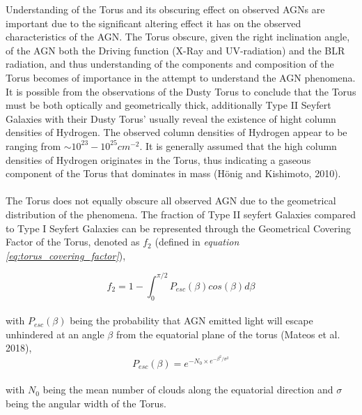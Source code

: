 \documentclass[a4paper, 12pt, twoside]{article}
\begin{document}
Understanding of the Torus and its obscuring effect on observed AGNs are important due to the significant altering effect it has on the observed characteristics of the AGN. The Torus obscure, given the right inclination angle, of the AGN both the Driving function (X-Ray and UV-radiation) and the BLR radiation, and thus understanding of the components and composition of the Torus becomes of importance in the attempt to understand the AGN phenomena. It is possible from the observations of the Dusty Torus to conclude that the Torus must be both optically and geometrically thick, additionally Type II Seyfert Galaxies with their Dusty Torus' usually reveal the existence of hight column densities of Hydrogen. The observed column densities of Hydrogen appear to be ranging from $\sim 10^{23} - 10^{25} cm^{-2}$. It is generally assumed that the high column densities of Hydrogen originates in the Torus, thus indicating a gaseous component of the Torus that dominates in mass (Hönig and Kishimoto, 2010). \\
\\
The Torus does not equally obscure all observed AGN due to the geometrical distribution of the phenomena. The fraction of Type II seyfert Galaxies compared to Type I Seyfert Galaxies can be represented through the Geometrical Covering Factor of the Torus, denoted as $f_{2}$ (defined in \emph{equation \ref{eq:torus_covering_factor}}),

\begin{equation}
f_2 = 1 - \int_{0}^{\pi/2}P_{esc}(\beta)cos(\beta)d\beta
\label{eq:torus_covering_factor}
\end{equation}\\
with $P_{esc}(\beta)$ being the probability that AGN emitted light will escape unhindered at an angle $\beta$ from the equatorial plane of the torus (Mateos et al. 2018),
\begin{equation}
P_{esc}(\beta) = e^{-N_{0} \times e^{-\beta^{2}/\sigma^{2}}}
\label{eq:P_covering_factor}
\end{equation}\\
with $N_{0}$ being the mean number of clouds along the equatorial direction and $\sigma$ being the angular width of the Torus. 

\end{document}
